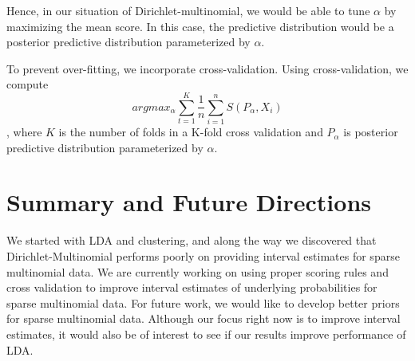 \documentclass{article}
\begin{document}
Hence, in our situation of Dirichlet-multinomial, we would be able to tune $\alpha$ by maximizing the mean score. In this case, the predictive distribution would be a posterior predictive distribution parameterized by $\alpha$.

To prevent over-fitting, we incorporate cross-validation. Using cross-validation, we compute $$ argmax_{\alpha} \sum_{t = 1}^{K} \frac{1}{n} \sum_{i = 1}^n S(P_{\alpha}, X_i)  $$, where $K$ is the number of folds in a K-fold cross validation and $P_{\alpha}$ is posterior predictive distribution parameterized by $\alpha$.


\section{Summary and Future Directions}

We started with LDA and clustering, and along the way we discovered that Dirichlet-Multinomial performs poorly on providing interval estimates for sparse multinomial data. We are currently working on using proper scoring rules and cross validation to improve interval estimates of underlying probabilities for sparse multinomial data. For future work, we would like to develop better priors for sparse multinomial data. Although our focus right now is to improve interval estimates, it would also be of interest to see if our results improve performance of LDA.



\printbibliography
\end{document}

